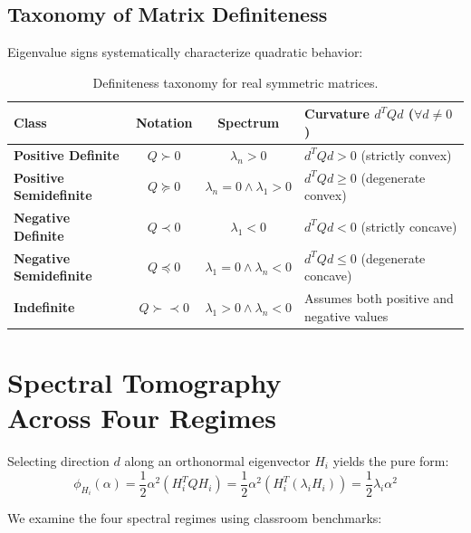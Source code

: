 \subsection{Taxonomy of Matrix Definiteness}
Eigenvalue signs systematically characterize quadratic behavior:

\begin{table}[H]
\centering
\small
\renewcommand{\arraystretch}{1.3}
\begin{tabularx}{\textwidth}{l c c X}
\toprule
\textbf{Class} & \textbf{Notation} & \textbf{Spectrum} & \textbf{Curvature $d^T Q d$ ($\forall d \neq 0$)} \\
\midrule
\textbf{Positive Definite} & $Q \succ 0$ & $\lambda_n > 0$ & $d^T Q d > 0$ (strictly convex) \\
\textbf{Positive Semidefinite} & $Q \succeq 0$ & $\lambda_n = 0 \land \lambda_1 > 0$ & $d^T Q d \ge 0$ (degenerate convex) \\
\textbf{Negative Definite} & $Q \prec 0$ & $\lambda_1 < 0$ & $d^T Q d < 0$ (strictly concave) \\
\textbf{Negative Semidefinite} & $Q \preceq 0$ & $\lambda_1 = 0 \land \lambda_n < 0$ & $d^T Q d \le 0$ (degenerate concave) \\
\textbf{Indefinite} & $Q \succ\prec 0$ & $\lambda_1 > 0 \land \lambda_n < 0$ & Assumes both positive and negative values \\
\bottomrule
\end{tabularx}
\caption{Definiteness taxonomy for real symmetric matrices.}
\label{tab:matrix-definiteness-en}
\end{table}


\FloatBarrier
\section[Spectral Tomography Across Four Regimes]{Spectral Tomography\\ Across Four Regimes}
\label{sec:opt-spectral-tomography-four-regimes-en}

Selecting direction $d$ along an orthonormal eigenvector $H_i$ yields the pure form:
\begin{equation}
\phi_{H_i}(\alpha) = \frac{1}{2} \alpha^2 (H_i^T Q H_i) = \frac{1}{2} \alpha^2 (H_i^T (\lambda_i H_i)) = \frac{1}{2} \lambda_i \alpha^2
\end{equation}

We examine the four spectral regimes using classroom benchmarks:

